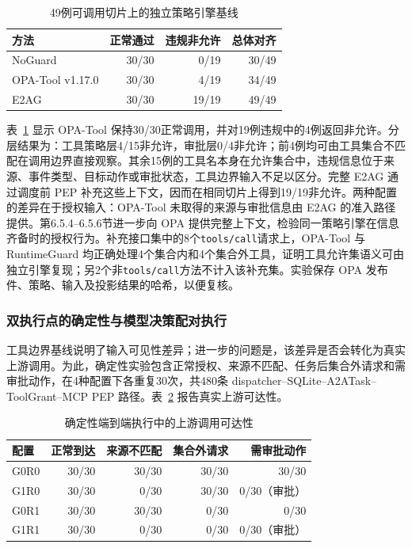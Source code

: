 \begin{table}[htbp]
\centering
\caption{49例可调用切片上的独立策略引擎基线}
\label{tab:rq2-opa-v11}
\small
\begin{tabular}{lrrr}
\toprule
方法 & 正常通过 & 违规非允许 & 总体对齐 \\
\midrule
NoGuard & 30/30 & 0/19 & 30/49 \\
OPA-Tool v1.17.0 & 30/30 & 4/19 & 34/49 \\
E2AG & 30/30 & 19/19 & 49/49 \\
\bottomrule
\end{tabular}
\end{table}

表~\ref{tab:rq2-opa-v11} 显示 OPA-Tool 保持30/30正常调用，并对19例违规中的4例返回非允许。分层结果为：工具策略层4/15非允许，审批层0/4非允许；前4例均可由工具集合不匹配在调用边界直接观察。其余15例的工具名本身在允许集合中，违规信息位于来源、事件类型、目标动作或审批状态，工具边界输入不足以区分。完整 E2AG 通过调度前 PEP 补充这些上下文，因而在相同切片上得到19/19非允许。两种配置的差异在于授权输入：OPA-Tool 未取得的来源与审批信息由 E2AG 的准入路径提供。第6.5.4--6.5.6节进一步向 OPA 提供完整上下文，检验同一策略引擎在信息齐备时的授权行为。补充接口集中的8个\texttt{tools/call}请求上，OPA-Tool 与 RuntimeGuard 均正确处理4个集合内和4个集合外工具，证明工具允许集语义可由独立引擎复现；另2个非\texttt{tools/call}方法不计入该补充集。实验保存 OPA 发布件、策略、输入及投影结果的哈希，以便复核。

\subsubsection{双执行点的确定性与模型决策配对执行}

工具边界基线说明了输入可见性差异；进一步的问题是，该差异是否会转化为真实上游调用。为此，确定性实验包含正常授权、来源不匹配、任务后集合外请求和需审批动作，在4种配置下各重复30次，共480条 dispatcher--SQLite--A2ATask--ToolGrant--MCP PEP 路径。表~\ref{tab:rq2-deterministic-v11} 报告真实上游可达性。

\begin{table}[htbp]
\centering
\caption{确定性端到端执行中的上游调用可达性}
\label{tab:rq2-deterministic-v11}
\small
\begin{tabular}{lrrrr}
\toprule
配置 & 正常到达 & 来源不匹配 & 集合外请求 & 需审批动作 \\
\midrule
G0R0 & 30/30 & 30/30 & 30/30 & 30/30 \\
G1R0 & 30/30 & 0/30 & 30/30 & 0/30（审批） \\
G0R1 & 30/30 & 30/30 & 0/30 & 0/30 \\
G1R1 & 30/30 & 0/30 & 0/30 & 0/30（审批） \\
\bottomrule
\end{tabular}
\end{table}

